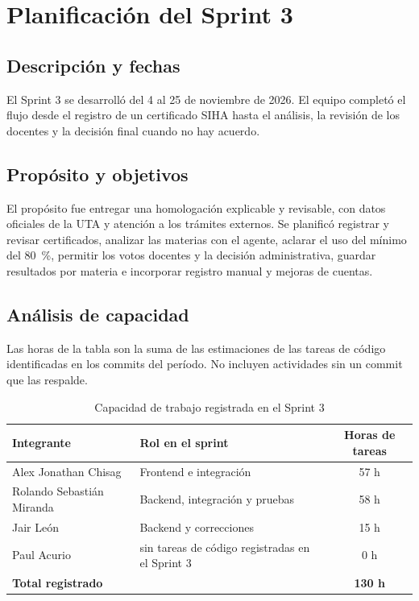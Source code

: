\section{Planificación del Sprint 3}

\subsection{Descripción y fechas}
El Sprint 3 se desarrolló del 4 al 25 de noviembre de 2026. El equipo completó el flujo desde el registro de un certificado SIHA hasta el análisis, la revisión de los docentes y la decisión final cuando no hay acuerdo.

\subsection{Propósito y objetivos}
El propósito fue entregar una homologación explicable y revisable, con datos oficiales de la UTA y atención a los trámites externos. Se planificó registrar y revisar certificados, analizar las materias con el agente, aclarar el uso del mínimo del 80~\%, permitir los votos docentes y la decisión administrativa, guardar resultados por materia e incorporar registro manual y mejoras de cuentas.

\subsection{Análisis de capacidad}
Las horas de la tabla son la suma de las estimaciones de las tareas de código identificadas en los commits del período. No incluyen actividades sin un commit que las respalde.

\begin{table}[H]\centering\small
\begin{tabularx}{\textwidth}{|X|X|c|}\hline
\rowcolor{grisTarjeta}\textbf{Integrante} & \textbf{Rol en el sprint} & \textbf{Horas de tareas}\\\hline
Alex Jonathan Chisag & Frontend e integración & 57 h\\\hline
Rolando Sebastián Miranda & Backend, integración y pruebas & 58 h\\\hline
Jair León & Backend y correcciones & 15 h\\\hline
Paul Acurio & sin tareas de código registradas en el Sprint 3 & 0 h\\\hline
\textbf{Total registrado} & & \textbf{130 h}\\\hline
\end{tabularx}\caption{Capacidad de trabajo registrada en el Sprint 3}
\end{table}

